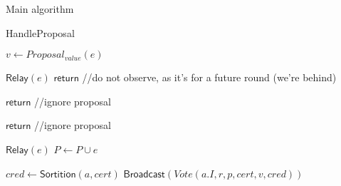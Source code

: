 \documentclass[10pt,a4paper]{article}
\begin{document}
\begin{section}{Main algorithm}
\begin{subsection}{HandleProposal}
    \begin{algorithm}[H]
        \caption{\underline{HandleProposal}}
        \label{algo:handle-proposal}
        \begin{algorithmic}[1]

            \State $v \gets Proposal_{value}(e)$

                \State $\mathsf{Relay}(e)$  %
                \State $\mathsf{return}$  //do not observe, as it's for a future round (we're behind)
            \EndIf

                \State $\mathsf{return}$  //ignore proposal
            \EndIf

                \State $\mathsf{return}$ //ignore proposal
            \EndIf

            \State $\mathsf{Relay}(e)$
            \State $P \gets P \cup e$

                    \State $cred \gets 
                    \mathsf{Sortition}(a, cert)$
                        \State $\mathsf{Broadcast}(Vote(a.I, r, p, cert, v,  cred))$
                    \EndIf
                \EndFor    
            \EndIf

        \EndFunction
        \end{algorithmic}
    \end{algorithm}
    

\end{subsection}
\end{section}
\end{document}
